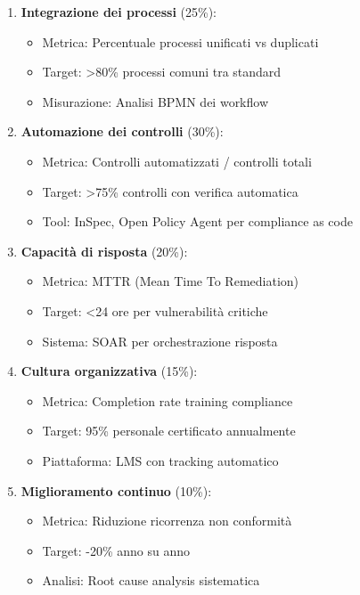 \begin{enumerate}
    \item \textbf{Integrazione dei processi} (25\%): 
    \begin{itemize}
        \item Metrica: Percentuale processi unificati vs duplicati
        \item Target: >80\% processi comuni tra standard
        \item Misurazione: Analisi BPMN dei workflow
    \end{itemize}
    
    \item \textbf{Automazione dei controlli} (30\%):
    \begin{itemize}
        \item Metrica: Controlli automatizzati / controlli totali
        \item Target: >75\% controlli con verifica automatica
        \item Tool: InSpec, Open Policy Agent per compliance as code
    \end{itemize}
    
    \item \textbf{Capacità di risposta} (20\%):
    \begin{itemize}
        \item Metrica: MTTR (Mean Time To Remediation)
        \item Target: <24 ore per vulnerabilità critiche
        \item Sistema: SOAR per orchestrazione risposta
    \end{itemize}
    
    \item \textbf{Cultura organizzativa} (15\%):
    \begin{itemize}
        \item Metrica: Completion rate training compliance
        \item Target: 95\% personale certificato annualmente
        \item Piattaforma: LMS con tracking automatico
    \end{itemize}
    
    \item \textbf{Miglioramento continuo} (10\%):
    \begin{itemize}
        \item Metrica: Riduzione ricorrenza non conformità
        \item Target: -20\% anno su anno
        \item Analisi: Root cause analysis sistematica
    \end{itemize}
\end{enumerate}

